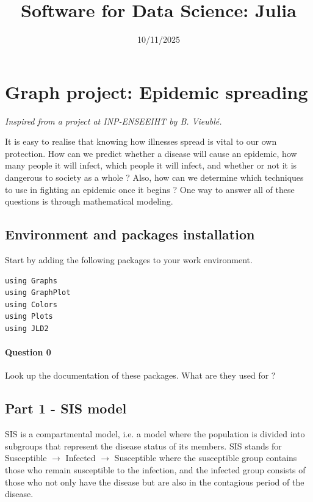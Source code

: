 \documentclass{article}
\title{Software for Data Science: Julia}
\date{10/11/2025}
\begin{document}
\maketitle
\section*{Graph project: Epidemic spreading}

\textit{Inspired from a project at INP-ENSEEIHT by B. Vieublé.}

\medskip

It is easy to realise that knowing how illnesses spread is vital to our own protection. How can we predict whether a disease will cause an epidemic, how many people it will infect, which people it will infect, and whether or not it is dangerous to society as a whole ? Also, how can we determine which techniques to use in fighting an epidemic once it begins ? One way to answer all of these questions is through mathematical modeling. 

\subsection*{Environment and packages installation}

Start by adding the following packages to your work environment. 

\begin{verbatim}
using Graphs
using GraphPlot
using Colors
using Plots
using JLD2
\end{verbatim}

\paragraph{Question 0} Look up the documentation of these packages. What are they used for ?

\subsection*{Part 1 - SIS model}

SIS is a compartmental model, i.e. a model where the population is divided into subgroups that represent the disease status of its members. SIS stands for Susceptible $\rightarrow$ Infected $\rightarrow$ Susceptible where the susceptible group contains those who remain susceptible to the infection, and the infected group consists of those who not only have the disease but are also in the contagious period of the disease.
\end{document}
